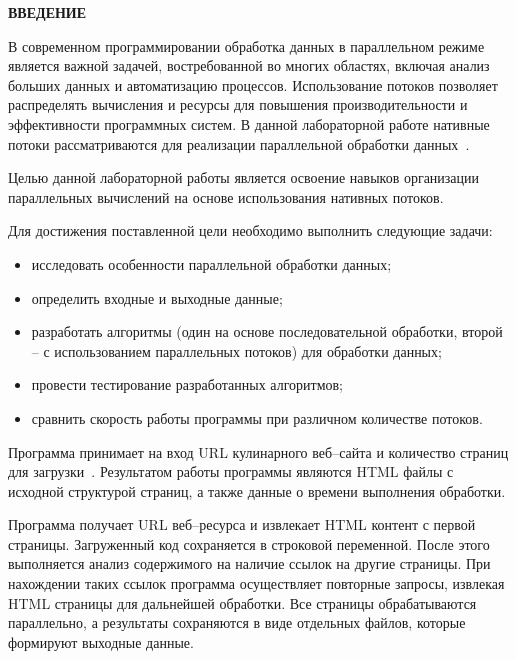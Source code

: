 \begin{center}
    \textbf{ВВЕДЕНИЕ}
\end{center}

В современном программировании обработка данных в параллельном режиме является важной задачей, востребованной во многих областях, включая анализ больших данных и автоматизацию процессов. Использование потоков позволяет распределять вычисления и ресурсы для повышения производительности и эффективности программных систем. В данной лабораторной работе нативные потоки рассматриваются для реализации параллельной обработки данных~\cite{tanvar_parallel_programming}.


Целью данной лабораторной работы является освоение навыков организации параллельных вычислений на основе использования нативных потоков.

Для достижения поставленной цели необходимо выполнить следующие задачи:
\begin{itemize}
    \item исследовать особенности параллельной обработки данных;
    \item определить входные и выходные данные;
    \item разработать алгоритмы (один на основе последовательной обработки, второй -- с использованием параллельных потоков) для обработки данных;
    \item провести тестирование разработанных алгоритмов;
    \item сравнить скорость работы программы при различном количестве потоков.
\end{itemize}


Программа принимает на вход URL кулинарного веб--сайта и количество страниц для загрузки~\cite{eda_menu}.
Результатом работы программы являются HTML файлы с исходной структурой страниц, а также данные о времени выполнения обработки.


Программа получает URL веб--ресурса и извлекает HTML контент с первой страницы. Загруженный код сохраняется в строковой переменной. После этого выполняется анализ содержимого на наличие ссылок на другие страницы. При нахождении таких ссылок программа осуществляет повторные запросы, извлекая HTML страницы для дальнейшей обработки. Все страницы обрабатываются параллельно, а результаты сохраняются в виде отдельных файлов, которые формируют выходные данные.

